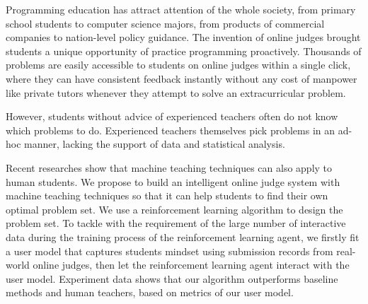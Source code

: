 \begin{englishabstract}

    Programming education has attract attention of the whole society,
    from primary school students to computer science majors,
    from products of commercial companies to nation-level policy guidance.
    The invention of online judges brought students a unique opportunity of practice programming proactively.
    Thousands of problems are easily accessible to students on online judges within a single click,
    where they can have consistent feedback instantly without any cost of manpower like private tutors
    whenever they attempt to solve an extracurricular problem.

    However, students without advice of experienced teachers often do not know which problems to do.
    Experienced teachers themselves pick problems in an ad-hoc manner,
    lacking the support of data and statistical analysis.

    Recent researches show that machine teaching techniques can also apply to human students.
    We propose to build an intelligent online judge system with machine teaching techniques
    so that it can help students to find their own optimal problem set.
    We use a reinforcement learning algorithm to design the problem set.
    To tackle with the requirement of the large number of interactive data
    during the training process of the reinforcement learning agent,
    we firstly fit a user model that captures students mindset using submission records from real-world online judges,
    then let the reinforcement learning agent interact with the user model.
    Experiment data shows that our algorithm outperforms baseline methods and human teachers,
    based on metrics of our user model.

\end{englishabstract}

